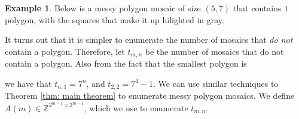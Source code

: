 \documentclass[12pt]{article}
\theoremstyle{plain}
\theoremstyle{definition}
\theoremstyle{remark}
\theoremstyle{definition}
\newtheorem{exmp}{Example}[section]
\newcommand{\cell}[4]{ \draw[thick] ( #1 , #2 ) rectangle ( #3 , #4 );}
\newcommand{\cellA}[4]{ \draw[thick] ( #1 , #2 ) rectangle ( #3 , #4 ); \draw[red, thick, densely dotted] (#3 * 0.5 + #1 * 0.5 , #2) -- (#3, #4 * 0.5 + #2 * 0.5);}
\newcommand{\cellB}[4]{ \draw[thick] ( #1 , #2 ) rectangle ( #3 , #4 ); \draw[red, thick, densely dotted] (#3 * 0.5 + #1 * 0.5 , #2) -- (#1, #4 * 0.5 + #2 * 0.5);}
\newcommand{\cellC}[4]{ \draw[thick] ( #1 , #2 ) rectangle ( #3 , #4 ); \draw[red, thick, densely dotted] (#3 * 0.5 + #1 * 0.5 , #4) -- (#1, #4 * 0.5 + #2 * 0.5);}
\newcommand{\cellD}[4]{ \draw[thick] ( #1 , #2 ) rectangle ( #3 , #4 ); \draw[red, thick, densely dotted] (#3 * 0.5 + #1 * 0.5 , #4) -- (#3, #4 * 0.5 + #2 * 0.5);}
\newcommand{\cellE}[4]{ \draw[thick] ( #1 , #2 ) rectangle ( #3 , #4 ); \draw[red, thick, densely dotted] (#3 * 0.5 + #1 * 0.5 , #2) -- (#3 * 0.5 + #1 * 0.5 , #4);}
\newcommand{\cellF}[4]{ \draw[thick] ( #1 , #2 ) rectangle ( #3 , #4 ); \draw[red, thick, densely dotted] (#3, #4 * 0.5 + #2 * 0.5) -- (#1, #4 * 0.5 + #2 * 0.5);}
\newcommand{\cellAf}[4]{\filldraw[gray!40] ( #1 , #2 ) rectangle ( #3 , #4 ); \draw[thick] ( #1 , #2 ) rectangle ( #3 , #4 ); \draw[red, thick, densely dotted] (#3 * 0.5 + #1 * 0.5 , #2) -- (#3, #4 * 0.5 + #2 * 0.5);}
\newcommand{\cellBf}[4]{\filldraw[gray!40] ( #1 , #2 ) rectangle ( #3 , #4 ); \draw[thick] ( #1 , #2 ) rectangle ( #3 , #4 ); \draw[red, thick, densely dotted] (#3 * 0.5 + #1 * 0.5 , #2) -- (#1, #4 * 0.5 + #2 * 0.5);}
\newcommand{\cellCf}[4]{\filldraw[gray!40] ( #1 , #2 ) rectangle ( #3 , #4 ); \draw[thick] ( #1 , #2 ) rectangle ( #3 , #4 ); \draw[red, thick, densely dotted] (#3 * 0.5 + #1 * 0.5 , #4) -- (#1, #4 * 0.5 + #2 * 0.5);}
\newcommand{\cellDf}[4]{\filldraw[gray!40] ( #1 , #2 ) rectangle ( #3 , #4 ); \draw[thick] ( #1 , #2 ) rectangle ( #3 , #4 ); \draw[red, thick, densely dotted] (#3 * 0.5 + #1 * 0.5 , #4) -- (#3, #4 * 0.5 + #2 * 0.5);}
\newcommand{\cellEf}[4]{\filldraw[gray!40] ( #1 , #2 ) rectangle ( #3 , #4 ); \draw[thick] ( #1 , #2 ) rectangle ( #3 , #4 ); \draw[red, thick, densely dotted] (#3 * 0.5 + #1 * 0.5 , #2) -- (#3 * 0.5 + #1 * 0.5 , #4);}
\newcommand{\cellFf}[4]{\filldraw[gray!40] ( #1 , #2 ) rectangle ( #3 , #4 ); \draw[thick] ( #1 , #2 ) rectangle ( #3 , #4 ); \draw[red, thick, densely dotted] (#3, #4 * 0.5 + #2 * 0.5) -- (#1, #4 * 0.5 + #2 * 0.5);}
\begin{document}
\begin{exmp}
\label{exmp: messy sap}
Below is a messy polygon mosaic of size $(5,7)$ that contains $1$ polygon, with the squares that make it up hilighted in gray. 

\begin{center}
\end{center}
\end{exmp}

It turns out that it is simpler to enumerate the number of mosaics that \textit{do not} contain a polygon. Therefore, let $t_{m,n}$ be the number of mosaics that do not contain a polygon. Also from the fact that the smallest polygon is

\begin{center}
\end{center}

we have that $t_{n,1}=7^n$, and $t_{2,2} = 7^4 - 1$. We can use similar techniques to Theorem \ref{thm: main theorem} to enumerate messy polygon mosaics. We define $A(m) \in \mathbb{Z}^{2^{m-1} \times 2^{m-1}}$, which we use to enumerate $t_{m,n}$.
\end{document}
